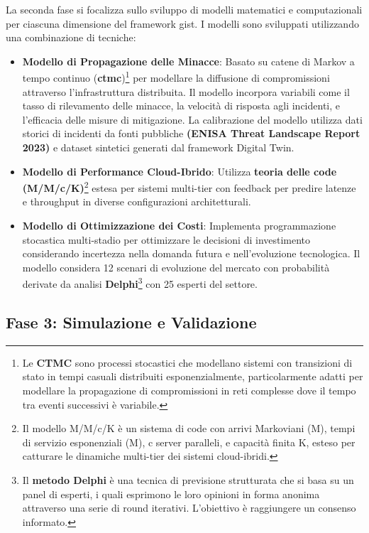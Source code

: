 \label{ssec:fase2}
La seconda fase si focalizza sullo sviluppo di modelli matematici e computazionali per ciascuna dimensione del framework \gls{gist}. I modelli sono sviluppati utilizzando una combinazione di tecniche:
\begin{itemize}
    \item \textbf{Modello di Propagazione delle Minacce}: Basato su catene di Markov a tempo continuo (\textbf{\gls{ctmc}})\footnote{Le \textbf{CTMC} sono processi stocastici che modellano sistemi con transizioni di stato in tempi casuali distribuiti esponenzialmente, particolarmente adatti per modellare la propagazione di compromissioni in reti complesse dove il tempo tra eventi successivi è variabile.} per modellare la diffusione di compromissioni attraverso l'infrastruttura distribuita. Il modello incorpora variabili come il tasso di rilevamento delle minacce, la velocità di risposta agli incidenti, e l'efficacia delle misure di mitigazione. La calibrazione del modello utilizza dati storici di incidenti da fonti pubbliche \textbf{(ENISA Threat Landscape Report 2023)} e dataset sintetici generati dal framework Digital Twin.
\item \textbf{Modello di Performance Cloud-Ibrido}: Utilizza \textbf{teoria delle code (M/M/c/K)}\footnote{Il modello M/M/c/K è un sistema di code con arrivi Markoviani (M), tempi di servizio esponenziali (M), c server paralleli, e capacità finita K, esteso per catturare le dinamiche multi-tier dei sistemi cloud-ibridi.} estesa per sistemi multi-tier con feedback per predire latenze e throughput in diverse configurazioni architetturali. 
\item \textbf{Modello di Ottimizzazione dei Costi}: Implementa programmazione stocastica multi-stadio per ottimizzare le decisioni di investimento considerando incertezza nella domanda futura e nell'evoluzione tecnologica. Il modello considera 12 scenari di evoluzione del mercato con probabilità derivate da analisi \textbf{Delphi}\footnote{Il \textbf{metodo Delphi} è una tecnica di previsione strutturata che si basa su un panel di esperti, i quali esprimono le loro opinioni in forma anonima attraverso una serie di round iterativi. L'obiettivo è raggiungere un consenso informato.} con 25 esperti del settore.

\end{itemize}

\subsection{Fase 3: Simulazione e Validazione}

